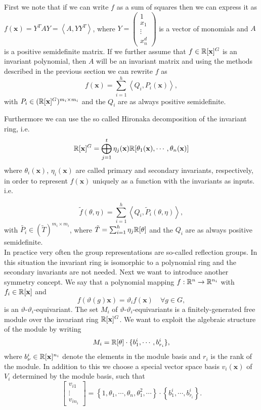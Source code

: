 \documentclass[]{article}
\begin{document}
First we note that if we can write $f$ as a sum of squares then we can express it as $f(\textbf{x}) = Y^TAY =\left<A,YY^T\right>$, where $Y=\begin{pmatrix}1\\x_1\\\vdots\\x_n^d\end{pmatrix}$ is a vector of monomials and $A$ is a positive semidefinite matrix. 
If we further assume that $f\in \mathbb R[\mathbf{x}]^G$ is an invariant polynomial, then $A$ will be an invariant matrix and using the methods described in the previous section we can rewrite $f$ as 
\[f(\textbf{x}) = \sum_{i=1}^{h}\left<Q_i,P_i(\mathbf{x})\right>,\]
with $P_i\in (\mathbb R[\mathbf{x}]^G)^{m_i\times m_i}$
and the $Q_i$ are as always positive semidefinite.  

Furthermore we can use the so called Hironaka decomposition of the invariant ring, i.e.
\[\mathbb R[\mathbf{x}]^G = \bigoplus_{j=1}^{t}\eta_j(\textbf{x})\mathbb R[\theta_1(\textbf{x}), \cdots, \theta_n(\mathbf{x})]\] 
where $\theta_i(\mathbf{x})$, $\eta_i(\mathbf{x})$ are called primary and secondary invariants, respectively, in order to represent $f(\mathbf{x})$ uniquely as a function with the invariants as inputs. i.e.

\[\tilde{f}(\theta,\eta) = \sum_{i=1}^{h}\left<Q_i,\tilde{P}_i(\theta,\eta)\right>,\] 
with $\tilde{P_i} \in (\tilde{T})^{m_i\times m_i}$, where $\tilde{T} = \sum_{i=1}^{h}\eta_j\mathbb R[\theta]$ and the $Q_i$ are as always positive semidefinite.\\

In practice very often the group representations are so-called reflection groups. In this situation the invariant ring is 
isomorphic to a polynomial ring and the secondary invariants are not needed. 
Next we want to introduce another symmetry concept. We say that a polynomial mapping $f:\mathbb R^n\rightarrow \mathbb R^{n_i}$ with $f_i\in\mathbb R[\mathbf{x}]$ and 
\[ f(\vartheta(g)\mathbf{x}) =\vartheta_i f(\mathbf{x})\quad \forall g\in G, \]
is an $\vartheta$-$\vartheta_i$-equivariant. The set $M_i$ of $\vartheta$-$\vartheta_i$-equivariants is a finitely-generated free module over
the invariant ring $\mathbb R[\mathbf{x}]^G$. We want to exploit the algebraic structure of the module by writing 
\[M_i = \mathbb R[\theta]\cdot\{b_1^i,\cdots,b_{r_i}^i\},\]
where $b_{\nu}^i\in \mathbb R[\mathbf{x}]^{n_i}$ denote the elements in the module basis and $r_i$ is the rank of the module.  In addition to this we choose a special vector space basis $v_i(\mathbf{x})$ of $V_i$ determined by the module basis, such that
\[\begin{bmatrix}v_{i1}\\ \vdots \\ v_{in_i}\end{bmatrix}= \left\{1,\theta_1,\cdots, \theta_n,\theta_1^2,\cdots\right\}\cdot\left\{b_1^i,\cdots,b_{r_i}^i\right\}.\]
\end{document}
